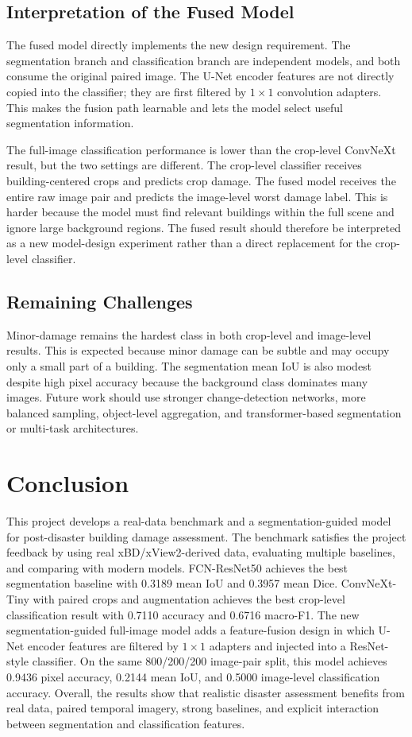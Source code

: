 \documentclass[10pt,conference]{IEEEtran}
\begin{document}
\subsection{Interpretation of the Fused Model}
The fused model directly implements the new design requirement. The segmentation branch and classification branch are independent models, and both consume the original paired image. The U-Net encoder features are not directly copied into the classifier; they are first filtered by $1\times1$ convolution adapters. This makes the fusion path learnable and lets the model select useful segmentation information.

The full-image classification performance is lower than the crop-level ConvNeXt result, but the two settings are different. The crop-level classifier receives building-centered crops and predicts crop damage. The fused model receives the entire raw image pair and predicts the image-level worst damage label. This is harder because the model must find relevant buildings within the full scene and ignore large background regions. The fused result should therefore be interpreted as a new model-design experiment rather than a direct replacement for the crop-level classifier.

\subsection{Remaining Challenges}
Minor-damage remains the hardest class in both crop-level and image-level results. This is expected because minor damage can be subtle and may occupy only a small part of a building. The segmentation mean IoU is also modest despite high pixel accuracy because the background class dominates many images. Future work should use stronger change-detection networks, more balanced sampling, object-level aggregation, and transformer-based segmentation or multi-task architectures.

\section{Conclusion}
This project develops a real-data benchmark and a segmentation-guided model for post-disaster building damage assessment. The benchmark satisfies the project feedback by using real xBD/xView2-derived data, evaluating multiple baselines, and comparing with modern models. FCN-ResNet50 achieves the best segmentation baseline with 0.3189 mean IoU and 0.3957 mean Dice. ConvNeXt-Tiny with paired crops and augmentation achieves the best crop-level classification result with 0.7110 accuracy and 0.6716 macro-F1. The new segmentation-guided full-image model adds a feature-fusion design in which U-Net encoder features are filtered by $1\times1$ adapters and injected into a ResNet-style classifier. On the same 800/200/200 image-pair split, this model achieves 0.9436 pixel accuracy, 0.2144 mean IoU, and 0.5000 image-level classification accuracy. Overall, the results show that realistic disaster assessment benefits from real data, paired temporal imagery, strong baselines, and explicit interaction between segmentation and classification features.



\end{document}
